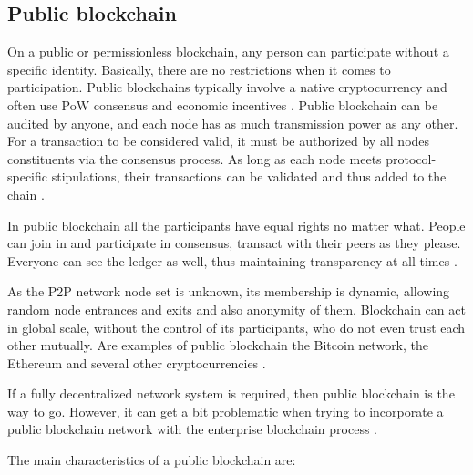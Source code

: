 \subsection{Public blockchain}\label{sec:blockchainPublica}
On a public or permissionless blockchain, any person can participate without a specific identity. Basically, there are no restrictions when it comes to participation. Public blockchains typically involve a native cryptocurrency and often use \acf{PoW} consensus and economic incentives \cite{androulaki2018hyperledger}. Public blockchain can be audited by anyone, and each node has as much transmission power as any other. For a transaction to be considered valid, it must be authorized by all nodes constituents via the consensus process. As long as each node meets protocol-specific stipulations, their transactions can be validated and thus added to the chain \cite{Comstor2018}.

In public blockchain all the participants have equal rights no matter what. People can join in and participate in consensus, transact with their peers as they please. Everyone can see the ledger as well, thus maintaining transparency at all times \cite{101blockchains}.

As the P2P network node set is unknown, its membership is dynamic, allowing random node entrances and exits and also anonymity of them. Blockchain can act in global scale, without the control of its participants, who do not even trust each other mutually. Are examples of public blockchain the Bitcoin network, the Ethereum and several other cryptocurrencies \cite{bashir2018mastering, antonopoulos2017mastering}.

If a fully decentralized network system is required, then public blockchain is the way to go. However, it can get a bit problematic when trying to incorporate a public blockchain network with the enterprise blockchain process \cite{101blockchains}.

The main characteristics of a public blockchain are:

